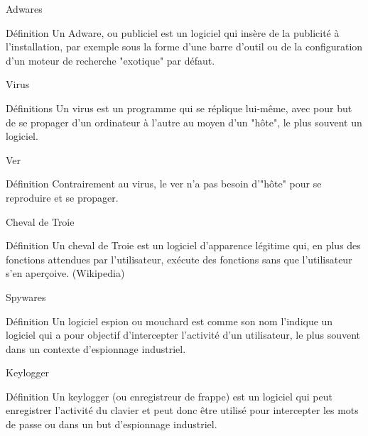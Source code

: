 \documentclass[12pt]{beamer}
\begin{document}
		\begin{frame}{Adwares}
			\begin{exampleblock}{Définition}
						Un \alert{Adware}, ou \alert{publiciel} est un logiciel qui insère de la publicité à l'installation, par exemple sous la forme d'une barre d'outil ou de la configuration d'un moteur de recherche "exotique" par défaut.
				\end{exampleblock}		
		\end{frame}
		
		\begin{frame}{Virus}
			\begin{exampleblock}{Définitions}
						Un \alert{virus} est un programme qui se réplique lui-même, avec pour but de se propager d'un ordinateur à l'autre au moyen d'un "hôte", le plus souvent un logiciel.
				\end{exampleblock}		
		\end{frame}
		
		\begin{frame}{Ver}
			\begin{exampleblock}{Définition}
						Contrairement au virus, le \alert{ver} n'a pas besoin d'"hôte" pour se reproduire et se propager. 
				\end{exampleblock}		
		\end{frame}
		
		\begin{frame}{Cheval de Troie}
			\begin{exampleblock}{Définition}
						Un \alert{cheval de Troie} est un logiciel d'apparence légitime qui, en plus des fonctions attendues par l'utilisateur, exécute des fonctions sans que l'utilisateur s'en aperçoive. (Wikipedia)
				\end{exampleblock}		
		\end{frame}
		
		\begin{frame}{Spywares}
			\begin{exampleblock}{Définition}
						Un \alert{logiciel espion} ou \alert{mouchard} est comme son nom l'indique un  logiciel qui a pour objectif d'intercepter l'activité d'un utilisateur, le plus souvent dans un contexte d'espionnage industriel.
				\end{exampleblock}		
		\end{frame}		
		
		\begin{frame}{Keylogger}
			\begin{exampleblock}{Définition}
						Un \alert{keylogger} (ou enregistreur de frappe) est un logiciel qui peut enregistrer l'activité du clavier et peut donc être utilisé pour intercepter les mots de passe ou dans un but d'espionnage industriel.
				\end{exampleblock}		
		\end{frame}
		
\end{document}
